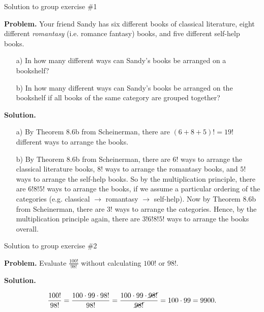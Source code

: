 \documentclass[10pt]{beamer}
\begin{document}
\begin{frame}{Solution to group exercise \#1}

\footnotesize 
\textbf{Problem.} Your friend Sandy has six different books of classical literature, eight different \textit{romantasy} (i.e. romance fantasy) books, and five different self-help books.
	\begin{itemize}
	\item[a)] In how many different ways can Sandy's books be arranged on a bookshelf?
	\item[b)] In how many different ways can Sandy's books be arranged on the bookshelf if all books of the same category are grouped together? 
	\end{itemize}
\vfill 

\textbf{Solution.}

	\begin{itemize}
	\item[a)] By Theorem 8.6b from Scheinerman, there are $(6+8+5)! = 19!$ different ways to arrange the books.
	\item[b)] By Theorem 8.6b from Scheinerman, there are $6!$ ways to arrange the classical literature books, $8!$ ways to arrange the romantasy books, and $5!$ ways to arrange the self-help books.   So by the multiplication principle, there are $6!8!5!$ ways to arrange the books, if we assume a particular ordering of the categories (e.g. classical $\rightarrow$ romantasy $\rightarrow$ self-help).  Now by Theorem 8.6b from Scheinerman, there are $3!$ ways to arrange the categories. Hence, by the multiplication principle again, there are  $3!6!8!5!$ ways to arrange the books overall.
	\end{itemize}
\end{frame}


\begin{frame}{Solution to group exercise \#2}


\textbf{Problem.}   Evaluate $\frac{100!}{98!}$ without calculating $100!$ or $98!$.
\vfill 

\textbf{Solution.}

\[ \displaystyle\frac{100!}{98!} = \displaystyle\frac{100 \cdot 99 \cdot 98!}{98!} = \displaystyle\frac{100 \cdot 99 \cdot \cancel{98!}}{\cancel{98!}} = 100 \cdot 99 = 9900.\]
\end{frame}
\end{document}
